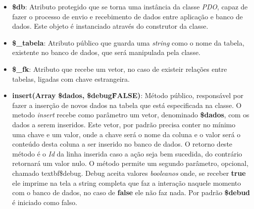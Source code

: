             \begin{itemize}
                \item\textbf{\$db}: Atributo protegido que se torna uma instância da classe \emph{PDO}, capaz de fazer o processo de envio e recebimento de dados entre aplicação e banco de dados. Este objeto é instanciado através do construtor da classe.

                \item\textbf{\$\_tabela}: Atributo público que guarda uma \emph{string} como o nome da tabela, existente no banco de dados, que será manipulada pela classe.

                \item\textbf{\$\_fk}: Atributo que recebe um vetor, no caso de existeir relações entre tabelas, ligadas com chave estrangeira.

                \item\textbf{insert(Array \$dados, \$debug\=FALSE)}: Método público, responsável por fazer a inserção de novos dados na tabela que está especificada na classe. O metodo \emph{insert} recebe como parâmetro um vetor, denominado \textbf{\$dados}, com os dados a serem inseridos. Este vetor, por padrão precisa conter no mínimo uma chave e um valor, onde a chave será o nome da coluna e o valor será o conteúdo desta coluna a ser inserido no banco de dados. O retorno deste método é o \emph{Id} da linha inserida caso a ação seja bem sucedida, do contrário retornará um valor nulo. O método permite um segundo parâmetro, opcional, chamado textbf{\$debug}. Debug aceita valores \emph{booleanos} onde, se receber \textbf{true} ele imprime na tela a string completa que faz a interação naquele momento com o banco de dados, no caso de \textbf{false} ele não faz nada. Por padrão \textbf{\$debud} é iniciado como falso.


\end{itemize}

